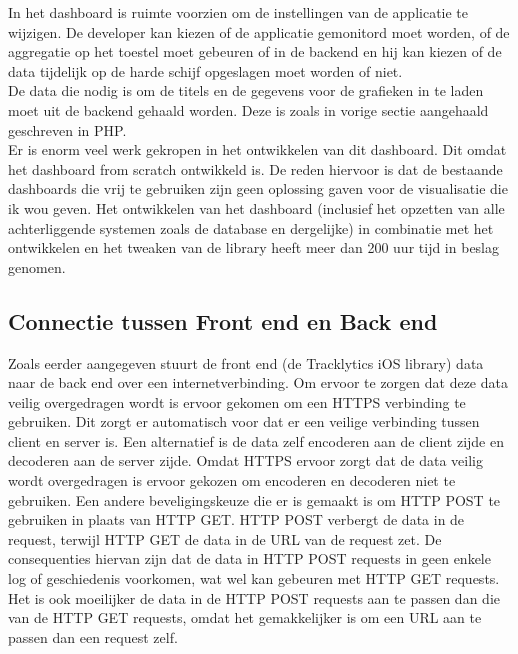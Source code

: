 In het dashboard is ruimte voorzien om de instellingen van de applicatie te wijzigen. De developer kan kiezen of de applicatie gemonitord moet worden, of de aggregatie op het toestel moet gebeuren of in de backend en hij kan kiezen of de data tijdelijk op de harde schijf opgeslagen moet worden of niet. \\


De data die nodig is om de titels en de gegevens voor de grafieken in te laden moet uit de backend gehaald worden. Deze is zoals in vorige sectie aangehaald geschreven in PHP. \\ 

Er is enorm veel werk gekropen in het ontwikkelen van dit dashboard. Dit omdat het dashboard from scratch ontwikkeld is. De reden hiervoor is dat de bestaande dashboards die vrij te gebruiken zijn geen oplossing gaven voor de visualisatie die ik wou geven. Het ontwikkelen van het dashboard (inclusief het opzetten van alle achterliggende systemen zoals de database en dergelijke) in combinatie met het ontwikkelen en het tweaken van de library heeft meer dan 200 uur tijd in beslag genomen.

\subsection{Connectie tussen Front end en Back end}
Zoals eerder aangegeven stuurt de front end (de Tracklytics iOS library) data naar de back end over een internetverbinding. Om ervoor te zorgen dat deze data veilig overgedragen wordt is ervoor gekomen om een HTTPS verbinding te gebruiken. Dit zorgt er automatisch voor dat er een veilige verbinding tussen client en server is. Een alternatief is de data zelf encoderen aan de client zijde en decoderen aan de server zijde. Omdat HTTPS ervoor zorgt dat de data veilig wordt overgedragen is ervoor gekozen om encoderen en decoderen niet te gebruiken.
Een andere beveligingskeuze die er is gemaakt is om HTTP POST te gebruiken in plaats van HTTP GET. HTTP POST verbergt de data in de request, terwijl HTTP GET de data in de URL van de request zet. De consequenties hiervan zijn dat de data in HTTP POST requests in geen enkele log of geschiedenis voorkomen, wat wel kan gebeuren met HTTP GET requests. Het is ook moeilijker de data in de HTTP POST requests aan te passen dan die van de HTTP GET requests, omdat het gemakkelijker is om een URL aan te passen dan een request zelf.\\


